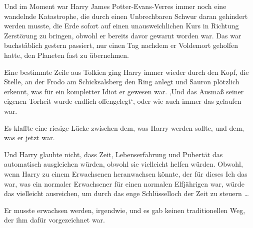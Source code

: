 Und im Moment war Harry James Potter-Evans-Verres immer noch eine wandelnde Katastrophe, die durch einen Unbrechbaren Schwur daran gehindert werden musste, die Erde sofort auf einen unausweichlichen Kurs in Richtung Zerstörung zu bringen, obwohl er bereits davor gewarnt worden war. Das war buchstäblich gestern passiert, nur einen Tag nachdem er Voldemort geholfen hatte, den Planeten fast zu übernehmen.

Eine bestimmte Zeile aus Tolkien ging Harry immer wieder durch den Kopf, die Stelle, an der Frodo am Schicksalsberg den Ring anlegt und Sauron plötzlich erkennt, was für ein kompletter Idiot er gewesen war. ‚Und das Ausmaß seiner eigenen Torheit wurde endlich offengelegt‘, oder wie auch immer das gelaufen war.

Es klaffte eine riesige Lücke zwischen dem, was Harry werden sollte, und dem, was er jetzt war.

Und Harry glaubte nicht, dass Zeit, Lebenserfahrung und Pubertät das automatisch ausgleichen würden, obwohl sie vielleicht helfen würden. Obwohl, wenn Harry zu einem Erwachsenen heranwachsen könnte, der für dieses Ich das war, was ein normaler Erwachsener für einen normalen Elfjährigen war, würde das vielleicht ausreichen, um durch das enge Schlüsselloch der Zeit zu steuern …

Er musste erwachsen werden, irgendwie, und es gab keinen traditionellen Weg, der ihm dafür vorgezeichnet war.

